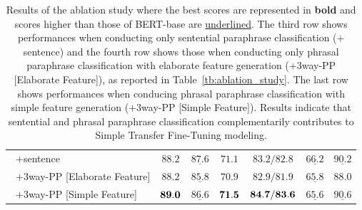 \documentclass[11pt,a4paper]{article}
\newcommand{\Tref}[1]{Table~\ref{#1}}
\begin{document}
\begin{table}[!t]
\begin{tabular}{l|ccc|ccc}
~$+$sentence                        &$88.2$                              &$\underline{87.6}$          &$71.1$                         &$83.2/82.8$                                     &$\underline{66.2}$         &$\underline{90.2}$ \\ %
~$+3$way-PP [Elaborate Feature]  &$88.2$                            &$\underline{85.8}$                  &$70.9$                          &$82.9/81.9$                                    &$\underline{65.8}$        &$88.0$                    \\ %
~$+3$way-PP [Simple Feature]       &${\bf 89.0}$                    &$\underline{86.6}$                   &${\bf 71.5}$                 &${\bf 84.7}/{\bf 83.6}$               &$\underline{65.6}$        &$\underline{90.6}$  \\\hline %
\end{tabular}
\caption{Results of the ablation study where the best scores are represented in \textbf{bold} and scores higher than those of BERT-base are \underline{underlined}. 
The third row shows performances when conducting only sentential paraphrase classification ($+$sentence) and the fourth row shows those when conducting only phrasal paraphrase classification with elaborate feature generation ($+3$way-PP [Elaborate Feature]), as reported in \Tref{tb:ablation_study}. 
The last row shows performances when conducing phrasal paraphrase classification with simple feature generation ($+3$way-PP [Simple Feature]). 
Results indicate that sentential and phrasal paraphrase classification complementarily contributes to Simple Transfer Fine-Tuning modeling.}
\label{tb:ablation_study_simplemodel}
\end{table}
\end{document}
